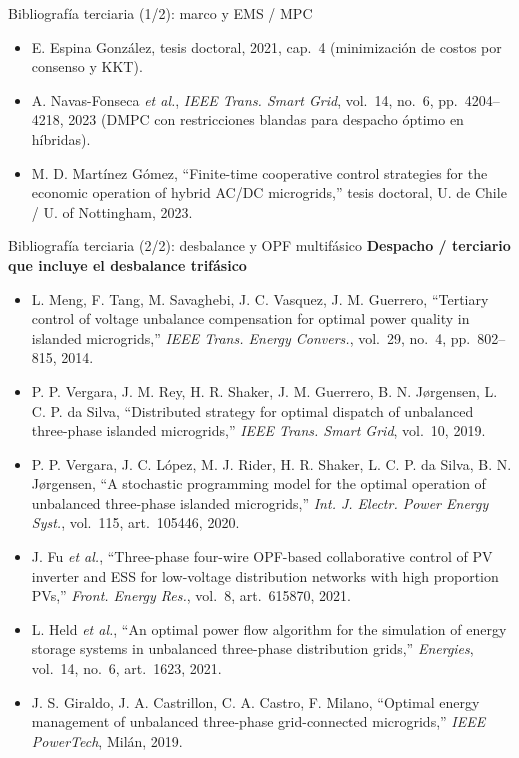 \documentclass[aspectratio=169,10pt,t]{beamer}
\begin{document}
\begin{frame}{Bibliografía terciaria (1/2): marco y EMS / MPC}
\begin{itemize}
    \item[{[2]}] E. Espina González, tesis doctoral, 2021, cap.~4 (minimización de costos por consenso y KKT).
    \item[{[6]}] A. Navas-Fonseca \emph{et al.}, \emph{IEEE Trans. Smart Grid}, vol.~14, no.~6, pp.~4204--4218, 2023 (DMPC con restricciones blandas para despacho óptimo en híbridas).
    \item[{[T9]}] M. D. Martínez Gómez, ``Finite-time cooperative control strategies for the economic operation of hybrid AC/DC microgrids,'' tesis doctoral, U. de Chile / U. of Nottingham, 2023.
  \end{itemize}
\end{frame}

\begin{frame}{Bibliografía terciaria (2/2): desbalance y OPF multifásico}
  \fontsize{5.8}{6.8}\selectfont
  \textbf{\color{usachT}Despacho / terciario que incluye el desbalance trifásico}
  \begin{itemize}\setlength\itemsep{0.5pt}
    \item[{[14]}] L. Meng, F. Tang, M. Savaghebi, J. C. Vasquez, J. M. Guerrero, ``Tertiary control of voltage unbalance compensation for optimal power quality in islanded microgrids,'' \emph{IEEE Trans. Energy Convers.}, vol.~29, no.~4, pp.~802--815, 2014.
    \item[{[T10]}] P. P. Vergara, J. M. Rey, H. R. Shaker, J. M. Guerrero, B. N. Jørgensen, L. C. P. da Silva, ``Distributed strategy for optimal dispatch of unbalanced three-phase islanded microgrids,'' \emph{IEEE Trans. Smart Grid}, vol.~10, 2019.
    \item[{[T11]}] P. P. Vergara, J. C. López, M. J. Rider, H. R. Shaker, L. C. P. da Silva, B. N. Jørgensen, ``A stochastic programming model for the optimal operation of unbalanced three-phase islanded microgrids,'' \emph{Int. J. Electr. Power Energy Syst.}, vol.~115, art.~105446, 2020.
    \item[{[T12]}] J. Fu \emph{et al.}, ``Three-phase four-wire OPF-based collaborative control of PV inverter and ESS for low-voltage distribution networks with high proportion PVs,'' \emph{Front. Energy Res.}, vol.~8, art.~615870, 2021.
    \item[{[T13]}] L. Held \emph{et al.}, ``An optimal power flow algorithm for the simulation of energy storage systems in unbalanced three-phase distribution grids,'' \emph{Energies}, vol.~14, no.~6, art.~1623, 2021.
    \item[{[T14]}] J. S. Giraldo, J. A. Castrillon, C. A. Castro, F. Milano, ``Optimal energy management of unbalanced three-phase grid-connected microgrids,'' \emph{IEEE PowerTech}, Milán, 2019.

\end{itemize}
\end{frame}
\end{document}
